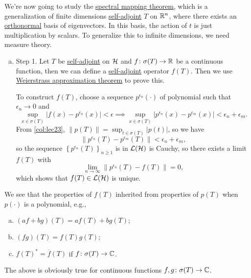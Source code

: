 We're now going to study the \hyperref[thm:spectral-mapping]{spectral mapping theorem}, which is a generalization of finite dimensions \hyperref[def:self-adjoint-op]{self-adjoint} \(T\) on \(\mathbb{\MakeUppercase{r}} ^n\), where there exists an \hyperref[def:orthonormal-system]{orthonormal} basis of eigenvectors. In this basis, the action of \(t\) is just multiplication by scalars. To generalize this to infinite dimensions, we need measure theory.

\begin{enumerate}[(a)]
	\item Step 1. Let \(T\) be \hyperref[def:self-adjoint-op]{self-adjoint} on \(\mathcal{\MakeUppercase{h}} \) and \(f\colon \sigma (T) \to \mathbb{\MakeUppercase{r}} \) be a continuous function, then we can define a \hyperref[def:self-adjoint-op]{self-adjoint} operator \(f(T)\). Then we use \hyperref[thm:Weierstrass-approximation]{Weierstrass approximation theorem} to prove this.

	      To construct \(f(T)\), choose a sequence \(p^{\epsilon _n}(\cdot)\) of polynomial such that \(\epsilon _n \to 0\) and
	      \[
		      \sup _{x\in \sigma (T)} \vert f(x) - p^{\epsilon _n}(x)  \vert < \epsilon
		      \implies \sup _{x\in \sigma (T)} \vert p^{\epsilon _n}(x) - p^{\epsilon _m}(x) \vert < \epsilon _n + \epsilon _m.
	      \]
	      From \autoref{col:lec23}, \(\lVert p(T) \rVert = \sup _{t\in \sigma (T)} \vert p(t) \vert \), so we have
	      \[
		      \lVert p^{\epsilon _n}(T) - p^{\epsilon _m}(T) \rVert < \epsilon _n + \epsilon _m,
	      \]
	      so the sequence \(\left\{ p^{\epsilon _n}(T) \right\} _{n\geq 1}\) is in \(\mathcal{\MakeUppercase{l}} (\mathcal{\MakeUppercase{h}} )\) is Cauchy, so there exists a limit \(f(T)\) with
	      \[
		      \lim_{n \to \infty} \lVert p^{\epsilon _n}(T) - f(T) \rVert = 0,
	      \]
	      which shows that \(f(T)\in \mathcal{\MakeUppercase{l}} (\mathcal{\MakeUppercase{h}} )\) is unique.
\end{enumerate}

We see that the properties of \(f(T)\) inherited from properties of \(p(T)\) when \(p(\cdot)\) is a polynomial, e.g.,
\begin{enumerate}[(a)]
	\item \((af + bg)(T) = af(T) + bg(T)\);
	\item \((fg)(T) = f(T) g(T)\);
	\item \(f(T)^{\ast} = \overline{f} (T)\) if \(f\colon \sigma (T) \to \mathbb{\MakeUppercase{c}}\).
\end{enumerate}
The above is obviously true for continuous functions \(f, g\colon \sigma (T) \to \mathbb{\MakeUppercase{c}} \).

